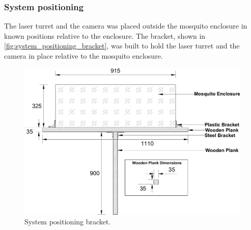 \subsubsection{System positioning}\label{subsubsec:system_positioning}
The laser turret and the camera was placed outside the mosquito enclosure in known positions relative to the enclosure. The bracket, shown in \autoref{fig:system_positioning_bracket}, was built to hold the laser turret and the camera in place relative to the mosquito enclosure.
\begin{figure}[h]
  \centering
  \includegraphics[width=\textwidth]{figures/hardware_design/system_positioning.pdf}
  \caption{System positioning bracket.}
  \label{fig:system_positioning_bracket}
\end{figure}


